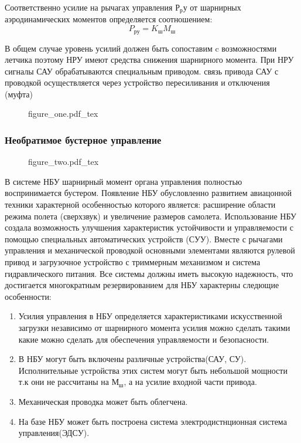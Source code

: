 \documentclass{article}
\begin{document}
Соответственно усилие на рычагах управления $Р_ру$ от шарнирных аэродинамических моментов определяется соотношением:
\[
P_{ру} = K_{ш} M_{ш}
\]

В общем случае уровень усилий должен быть сопоставим c возможностями летчика поэтому НРУ имеют средства снижения шарнирного момента. При НРУ сигналы САУ обрабатываются специальным приводом. связь привода САУ с проводкой осуществляется через устройство пересиливания и отключения (муфта)


\begin{figure}[h]
{figure_one.pdf_tex}
\end{figure}    

\subsubsection{Необратимое бустерное управление}

\begin{figure}[h]
{figure_two.pdf_tex}
\end{figure}

В системе НБУ шарнирный момент органа управления полностью воспринимается бустером. Появление НБУ обусловленно развитием авиацонной техники характерной особенностью которого является: расширение области режима полета (сверхзвук) и увеличение размеров самолета. Использование НБУ создала возможность улучшения характеристик устойчивости и управляемости с помощью специальных автоматических устройств (СУУ). Вместе с рычагами управления и механической проводкой основными элементами являются рулевой привод и загрузочное устройство с триммерным механизмом и система гидравлического питания. Все системы должны иметь высокую надежность, что достигается многократным резервированием для НБУ характерны следющие особенности:
\begin{enumerate}
\item Усилия управления в НБУ определяется характеристиками искусственной загрузки независимо от шарнирного момента усилия можно сделать такими какие можно сделать для обеспечения управляемости и безопасности.
\item В НБУ могут быть включены различные устройства(САУ, СУ). Исполнительные устройства этих систем могут быть небольшой мощности т.к они не рассчитаны на $М_ш$, а на усилие входной части привода.
\item Механическая проводка может быть облегчена.
\item На базе НБУ может быть построена система электродистнционная система управления(ЭДСУ).
\end{enumerate}
\end{document}

